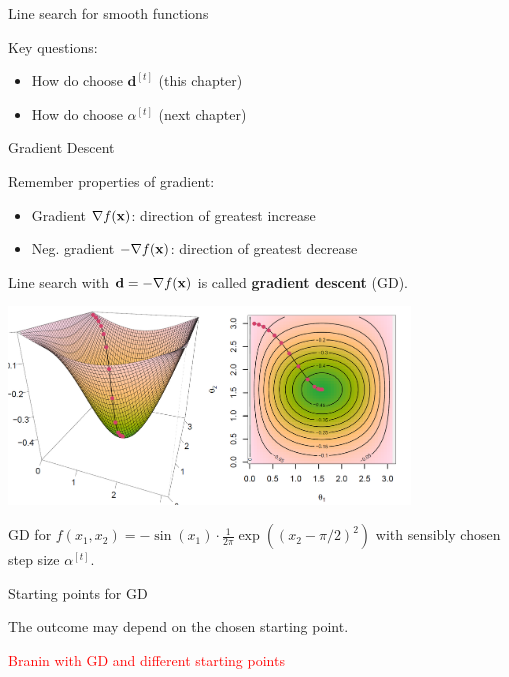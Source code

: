 \documentclass[11pt,compress,t,notes=noshow, xcolor=table]{beamer}
\begin{document}
\begin{vbframe}{Line search for smooth functions}
	\lz 

	Key questions: 
	\begin{itemize}
		\item How do choose $\mathbf{d}^{[t]}$ (this chapter)
		\item How do choose $\alpha^{[t]}$ (next chapter)
	\end{itemize}

\end{vbframe}


\begin{vbframe}{Gradient Descent}

	Remember properties of gradient: 

	\begin{itemize}
		\item Gradient $\nabla f(\mathbf{x})$: direction of greatest increase
		\item Neg. gradient $- \nabla f(\mathbf{x})$: direction of greatest decrease
	\end{itemize}

	\vspace*{0.3cm}

	Line search with $\mathbf{d} = - \nabla f(\mathbf{x})$ is called \textbf{gradient descent} (GD). 

	\begin{center}
		\includegraphics[width = 0.8\textwidth]{figure_man/example-descent1.png} \\
		\begin{footnotesize}
			GD for $f(x_1, x_2) = - \sin(x_1) \cdot \frac{1}{2\pi} \exp\left( (x_2 - \pi / 2)^2 \right)$ with sensibly chosen step size $\alpha^{[t]}$. 
		\end{footnotesize}
	\end{center}


\end{vbframe}

\begin{vbframe}{Starting points for GD}

The outcome may depend on the chosen starting point. 

\lz 

\textcolor{red}{Branin with GD and different starting points}

\end{vbframe}
\end{document}
